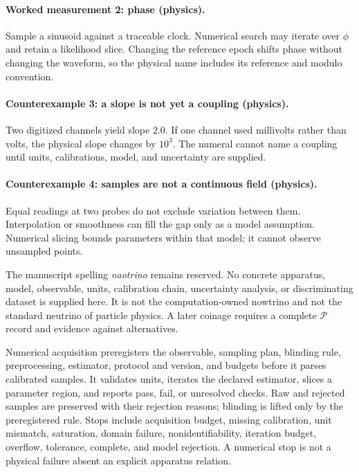 \paragraph{Worked measurement 2: phase (physics).} Sample a sinusoid against a traceable clock.  Numerical search may
iterate over \(\phi\) and retain a likelihood slice.  Changing the reference epoch shifts phase without changing the
waveform, so the physical name includes its reference and modulo convention.

\paragraph{Counterexample 3: a slope is not yet a coupling (physics).} Two digitized channels yield slope \(2.0\).
If one channel used millivolts rather than volts, the physical slope changes by \(10^3\).  The numeral cannot name a
coupling until units, calibrations, model, and uncertainty are supplied.

\paragraph{Counterexample 4: samples are not a continuous field (physics).} Equal readings at two probes do not
exclude variation between them.  Interpolation or smoothness can fill the gap only as a model assumption.  Numerical
slicing bounds parameters within that model; it cannot observe unsampled points.

The manuscript spelling \emph{naotrino} remains reserved.  No concrete apparatus, model, observable, units,
calibration chain, uncertainty analysis, or discriminating dataset is supplied here.  It is not the computation-owned
nowtrino and not the standard neutrino of particle physics.  A later coinage requires a complete \(\mathcal P\) record
and evidence against alternatives.

Numerical acquisition preregisters the observable, sampling plan, blinding rule, preprocessing, estimator, protocol
and version, and budgets before it parses calibrated samples.  It validates units, iterates the declared estimator,
slices a parameter region, and reports pass, fail, or unresolved checks.  Raw and rejected samples are preserved with
their rejection reasons; blinding is lifted only by the preregistered rule.  Stops include acquisition budget, missing
calibration, unit mismatch, saturation, domain failure, nonidentifiability, iteration budget, overflow, tolerance,
complete, and model rejection.  A numerical stop is not a physical failure absent an explicit apparatus relation.

